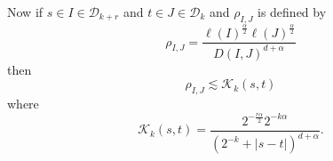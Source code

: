 \documentclass[12pt,reqno ]{amsart}
\numberwithin{equation}{section}
\theoremstyle{definition}
\newcommand{\C}{\ensuremath{\mathbb{C}^n}}
\newcommand{\R}{\ensuremath{\mathbb{R}}}
\newcommand{\Z}{\ensuremath{\mathbb{Z}}}
\newcommand{\D}{\ensuremath{\mathscr{D}}}
\newcommand{\V}[1]{\ensuremath{\vec{#1}}}
\newcommand{\ip}[2]{\ensuremath{\left\langle#1,#2\right\rangle}}
\newcommand{\W}[1]{\ensuremath{\widetilde{#1}}}
\newcommand{\T}[1]{\ensuremath{\text{#1}}}
\newcommand{\MC}[1]{\ensuremath{\mathcal{#1}}}
\begin{document}
\begin{comment}
Furthermore, let \begin{equation*} K_k ^{(r)} (s, t) = \sum_{I \in \D_{k + r}, \,   J \in \D_{k }} 1_{\T{good}}(I) \W{T}_{I, J} ^{(r)} |I|^{-\frac12} |J|^{-\frac12} 1_I(s) 1_J(t) \end{equation*} so that \begin{equation*} \sum_{I, J \in \D}  1_\text{good} (I)\left|\ip{\widetilde{T} ^{(r)}  _{I, J} \vec{f}_I}{\vec{g}_J}_{\C}\right| = \sum_{k \in \Z} \iint_{\R^2} \left|\ip{K_k ^{(r)} (s, t) \V{f}_{k + r}(s)}{\V{g}_k(t)}_{\C}\right| \, ds \, dt \end{equation*} so it is enough to show that \begin{equation*} \iint_{\R^2} \left|\ip{K_k ^{(r)} (s, t) \V{f}_{k + r}(s)}{\V{g}_k(t)}_{\C}\right| \, ds \, dt \lesssim 2^{-r\epsilon} \|\V{f}_{k + r}\|_{L^2(W)} \|\V{g} _{k} \|_{L^2(W^{-1})},  \end{equation*} or for arbitrary $\V{\phi}, \V{\psi}$ we need to show that \begin{equation*} \iint_{\R^2} \left|\ip{W^\frac12 (t) K_k ^{(r)} (s, t) W^{-\frac{1}{2}} (s) \V{\phi}(s)}{\V{\psi}(t)}_{\C} \right| \, ds \, dt \lesssim 2^{-\epsilon r} \|\V{\phi}\|_{L^2} \|\V{\psi}\|_{L^2}. \end{equation*}
\end{comment}


Now if $s \in I \in \D_{k + r}$ and $t \in J \in \D_k$ and $\rho_{I, J}$ is defined by \begin{equation*} \rho_{I, J}   = \frac{\ell(I)^\frac{ \alpha}{2} \ell(J)^\frac{ \alpha}{2}}{D(I, J)^{ d + \alpha}} \end{equation*} then \begin{equation*} \rho_{I, J} \lesssim \MC{K}_k(s, t)  \end{equation*} where \begin{equation*} \mathcal{K}_k(s, t) = \frac{ 2^{-\frac{r\alpha}{2}} 2^{-k\alpha} }{(2^{-k} + |s - t|)^{d + \alpha}}. \end{equation*}
\end{document}
